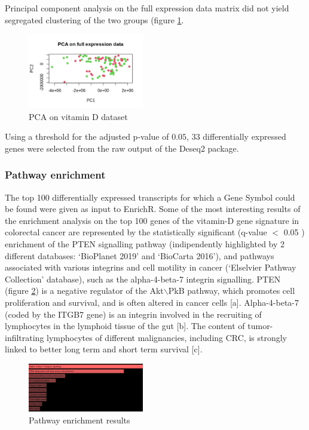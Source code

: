 \documentclass[fleqn,10pt]{SelfArx} %
\begin{document}
		Principal component analysis on the full expression data matrix did not yield segregated clustering of the two groups (figure \ref{fig:pca_vit_d}.

		\begin{figure}[ht]
			\includegraphics[width=0.45\textwidth]{figures/vit_d_pca.png}
			\caption{PCA on vitamin D dataset}
			\label{fig:pca_vit_d}
		\end{figure}

		Using a threshold for the adjusted p-value of $0.05$, $33$ differentially expressed genes were selected from the raw output of the Deseq2 package.

		\subsubsection{Pathway enrichment}
		The top 100 differentially expressed transcripts for which a Gene Symbol could be found were given as input to EnrichR.
		Some of the most interesting results of the enrichment analysis on the top 100 genes of the vitamin-D gene signature in colorectal cancer are represented by the statistically significant (q-value $<$ 0.05 ) enrichment of the PTEN signalling pathway (indipendently highlighted by 2 different databases: ‘BioPlanet 2019’ and ‘BioCarta 2016’), and pathways associated with various integrins and cell motility in cancer (‘Elselvier Pathway Collection’ database), such as the alpha-4-beta-7 integrin signalling.
PTEN (figure \ref{fig:pten}) is a negative regulator of the Akt$\backslash$PkB pathway, which promotes cell proliferation and survival, and is often altered in cancer cells [a].
Alpha-4-beta-7 (coded by the ITGB7 gene) is an integrin involved in the recruiting of lymphocytes in the lymphoid tissue of the gut [b].
The content of tumor-infiltrating lymphocytes of different malignancies, including CRC, is strongly linked to better long term and short term survival [c].


		\begin{figure}[ht]
			\includegraphics[width=0.45\textwidth]{figures/pten.png}
			\caption{Pathway enrichment results}
			\label{fig:pten}
		\end{figure}
\end{document}
